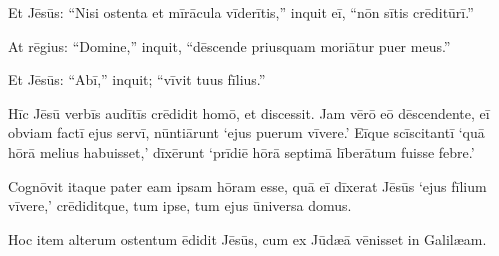 \Versus Et Jēsūs: ``Nisi ostenta et mīrācula vīderītis,'' inquit eī, ``nōn sītis crēditūrī.''

\Versus At rēgius: ``Domine,'' inquit, ``dēscende priusquam moriātur puer meus.''

\Versus Et Jēsūs: ``Abī,'' inquit; ``vīvit tuus fīlius.''

Hīc Jēsū verbīs audītīs crēdidit homō, et discessit.
\Versus Jam vērō eō dēscendente, eī obviam factī ejus servī, nūntiārunt `ejus puerum vīvere.'
\Versus Eīque scīscitantī `quā hōrā melius habuisset,' dīxērunt `prīdiē hōrā septimā līberātum fuisse febre.'

\Versus Cognōvit itaque pater eam ipsam hōram esse, quā eī dīxerat Jēsūs `ejus fīlium vīvere,' crēdiditque, tum ipse, tum ejus ūniversa domus.

\Versus Hoc item alterum ostentum ēdidit Jēsūs, cum ex Jūdæā vēnisset in Galilæam.

